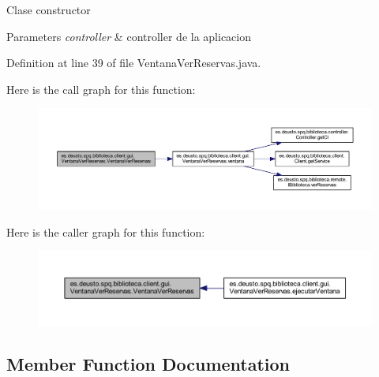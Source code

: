Clase constructor 
\begin{DoxyParams}{Parameters}
{\em controller} & controller de la aplicacion \\
\hline
\end{DoxyParams}


Definition at line 39 of file Ventana\+Ver\+Reservas.\+java.

Here is the call graph for this function\+:
\nopagebreak
\begin{figure}[H]
\begin{center}
\leavevmode
\includegraphics[width=350pt]{classes_1_1deusto_1_1spq_1_1biblioteca_1_1client_1_1gui_1_1_ventana_ver_reservas_a930fb2d66105004c9f728e82ec63defb_cgraph}
\end{center}
\end{figure}
Here is the caller graph for this function\+:
\nopagebreak
\begin{figure}[H]
\begin{center}
\leavevmode
\includegraphics[width=350pt]{classes_1_1deusto_1_1spq_1_1biblioteca_1_1client_1_1gui_1_1_ventana_ver_reservas_a930fb2d66105004c9f728e82ec63defb_icgraph}
\end{center}
\end{figure}


\subsection{Member Function Documentation}
\mbox{\label{classes_1_1deusto_1_1spq_1_1biblioteca_1_1client_1_1gui_1_1_ventana_ver_reservas_ac90346a9b9d28091f5504b4213e7f30b}} 
